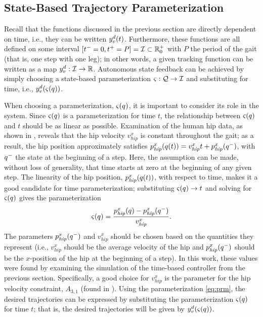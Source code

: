 \subsection{State-Based Trajectory Parameterization}

Recall that the functions discussed in the previous section are directly
dependent on time, i.e., they can be written $y_{v}^{d}(t)$.
%
Furthermore, these functions are all defined on some interval $[t^{-} = 0, t^{+}
= P] = \mathcal{I} \subset \mathbb{R}_{0}^{+}$ with $P$ the period of the gait (that is,
one step with one leg);
%
in other words, a given tracking function can be written as a map $y_{v}^{d} :
\mathcal{I} \to \mathbb{R}$.
%
Autonomous state feedback can be achieved by simply choosing a state-based
parameterization $\varsigma : \mathcal{Q} \to \mathcal{I}$ and substituting for time,
i.e., $y_{v}^{d}(\varsigma(q))$.

When choosing a parameterization, $\varsigma(q)$, it is important to consider
its role in the system.
%
Since $\varsigma(q)$ is a parameterization for time $t$, the relationship
between $\varsigma(q)$ and $t$ should be as linear as possible.
%
Examination of the human hip data, as shown in , reveals
that the hip velocity $v_{\mathit{hip}}^{x}$ is constant throughout the gait;
%
as a result, the hip position approximately satisfies
$p_{\mathit{hip}}^{x}(q(t)) = v_{\mathit{hip}}^x t + p_\mathit{hip}^x(q^{-})$,
with $q^{-}$ the state at the beginning of a step.
%
Here, the assumption can be made, without loss of generality, that time starts
at zero at the beginning of any given step.
%
The linearity of the hip position, $p_{\mathit{hip}}^{x}(q(t))$, with respect
to time, makes it a good candidate for time parameterization;
%
substituting $\varsigma(q) \to t$ and solving for $\varsigma(q)$ gives the
parameterization
\begin{align}
  \label{eq:prm}
  \varsigma(q) = \frac{p_{\mathit{hip}}^{x}(q) -
    p_{\mathit{hip}}^{x}(q^{-})}{v_{\mathit{hip}}^{x}}.
\end{align}
%
The parameters $p_{\mathit{hip}}^{x}(q^{-})$ and $v_{\mathit{hip}}^{x}$ should be
chosen based on the quantities they represent (i.e., $v_{\mathit{hip}}^{x}$
should be the average velocity of the hip and $p_{\mathit{hip}}^{x}(q^{-})$ should
be the $x$-position of the hip at the beginning of a step).
%
In this work, these values were found by examining the simulation of the
time-based controller from the previous section.
%
Specifically, a good choice for $v_{\mathit{hip}}^{x}$ is the parameter for the
hip velocity constraint, $A_{3,1}$ (found in ).
%
Using the parameterization \eqref{eq:prm}, the desired trajectories can be
expressed by substituting the parameterization $\varsigma(q)$ for time $t$;
%
that is, the desired trajectories will be given by
$y_{v}^{d}(\varsigma(q))$.


